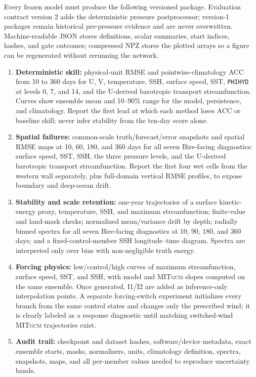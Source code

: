 \documentclass[11pt]{article}
\newcommand{\MITgcm}{\textsc{MITgcm}}
\begin{document}
Every frozen model must produce the following versioned package.  Evaluation contract
version 2 adds the deterministic pressure postprocessor; version-1 packages remain
historical pre-pressure evidence and are never overwritten.  Machine-readable
JSON stores definitions, scalar summaries, start indices, hashes, and gate outcomes;
compressed NPZ stores the plotted arrays so a figure can be regenerated without rerunning
the network.
\begin{enumerate}
\item \textbf{Deterministic skill:} physical-unit RMSE and pointwise-climatology ACC from
  10 to 360 days for U, V, temperature, SSH, surface speed, SST, \texttt{PHIHYD} at
  levels 0, 7, and 14, and the U-derived barotropic transport streamfunction.  Curves show ensemble mean and 10--90\% range for the model,
  persistence, and climatology.  Report the first lead at which each method loses ACC
  or baseline skill; never infer stability from the ten-day score alone.
\item \textbf{Spatial failures:} common-scale truth/forecast/error snapshots and spatial
  RMSE maps at 10, 60, 180, and 360 days for all seven Bire-facing diagnostics:
  surface speed, SST, SSH, the three pressure levels, and the U-derived barotropic
  transport streamfunction.
  Report the first four wet cells from the western wall separately,
  plus full-domain vertical RMSE profiles, to expose boundary and deep-ocean drift.
\item \textbf{Stability and scale retention:} one-year trajectories of a surface
  kinetic-energy proxy, temperature, SSH, and maximum streamfunction; finite-value and land-mask
  checks; normalized mean/variance drift by depth; radially binned spectra for all seven
  Bire-facing diagnostics at 10, 90, 180, and 360 days; and a fixed-control-member SSH longitude--time diagram.  Spectra
  are interpreted only over bins with non-negligible truth energy.
\item \textbf{Forcing physics:} low/control/high curves of maximum streamfunction,
  surface speed, SST, and SSH, with model and \MITgcm{} slopes computed on the same
  ensemble.  Once generated, I1/I2 are added as inference-only interpolation points.
  A separate forcing-switch experiment initializes every branch from the same control
  states and changes only the prescribed wind; it is clearly labeled as a response
  diagnostic until matching switched-wind \MITgcm{} trajectories exist.
\item \textbf{Audit trail:} checkpoint and dataset hashes, software/device metadata,
  exact ensemble starts, masks, normalizers, units, climatology definition, spectra,
  snapshots, maps, and all per-member values needed to reproduce uncertainty bands.
\end{enumerate}
\end{document}

